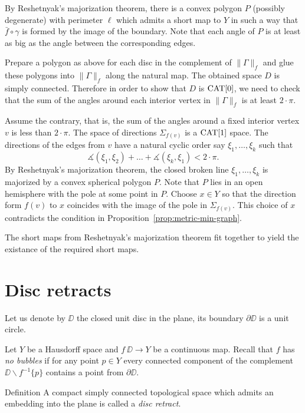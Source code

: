 \documentclass{article}
\begin{document}
By Reshetnyak's majorization theorem, there is a convex polygon $P$ (possibly degenerate) with perimeter $\ell$ which admits 
a short map to $Y$ in such a way that $\bar f\circ\gamma$ is formed by the image of the boundary.
Note that each angle of $P$ is at least as big as 
the angle between the corresponding edges.

Prepare a polygon as above for each disc in the complement of $\|\Gamma\|_f$
and glue these polygons into $\|\Gamma\|_f$ along the natural map.
The obtained space $D$ is simply connected.
Therefore in order to show that $D$ is $\mathop{\rm CAT}\nolimits[0]$,
we need to check that the sum of the angles around each interior vertex in $\|\Gamma\|_f$ is at least $2\cdot\pi$.


Assume the contrary, that is, 
the sum of the angles around a fixed interior vertex $v$ is less than $2\cdot\pi$.
The space of directions $\Sigma_{f(v)}$ is a $\mathop{\rm CAT}\nolimits[1]$ space.
The directions of the edges from $v$ have a natural
cyclic order say $\xi_1,\dots,\xi_k$
such that
\[\measuredangle(\xi_1,\xi_2)+\dots+\measuredangle(\xi_k,\xi_1)<2\cdot\pi.\]
By Reshetnyak's majorization theorem,
the closed broken line $\xi_1,\dots,\xi_k$ is majorized by a convex spherical polygon $P$.
Note that $P$ lies in an open hemisphere with the pole  at some point in $P$.
Choose $x\in Y$ so that the direction form $f(v)$ to $x$ coincides with the image of the pole in $\Sigma_{f(v)}$.
This choice of $x$ contradicts the condition in Proposition~\ref{prop:metric-min-graph}.

The short maps from Reshetnyak's majorization theorem fit together to yield the existance of the required short maps.
\qeds







\section{Disc retracts}\label{Metric minimizing discs}



Let us denote by $\DD$ the closed unit disc in the plane,
its boundary $\partial \DD$ is a unit circle.

Let $Y$ be a Hausdorff space and
$f\:\DD\to Y$ be a continuous map.
Recall that $f$ has \emph{no bubbles}
if for any point $p\in Y$ every connected component of the complement $\DD\backslash f^{-1}\{p\}$ contains a point from $\partial \DD$.

\begin{thm}{Definition}
A compact simply connected topological space which admits an embedding into the plane is 
called a \emph{disc retract}. 
\end{thm}
\end{document}
